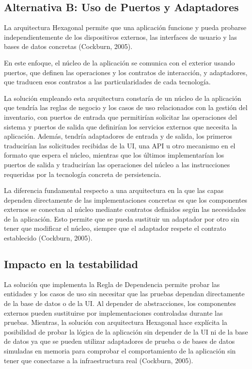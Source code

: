 \documentclass[12pt, a4paper]{article}
\begin{document}
        \subsection*{Alternativa B: Uso de Puertos y Adaptadores}
        La arquitectura Hexagonal permite que una aplicación funcione y pueda probarse independientemente de los dispositivos externos, las interfaces de usuario y las bases de datos concretas (Cockburn, 2005).

        En este enfoque, el núcleo de la aplicación se comunica con el exterior usando puertos, que definen las operaciones y los contratos de interacción, y adaptadores, que traducen esos contratos a las particularidades de cada tecnología.

        La solución empleando esta arquitectura constaría de un núcleo de la aplicación que tendría las reglas de negocio y los casos de uso relacionados con la gestión del inventario, con puertos de entrada que permitirían solicitar las operaciones del sistema y puertos de salida que definirían los servicios externos que necesita la aplicación. Además, tendría adaptadores de entrada y de salida, los primeros traducirían las solicitudes recibidas de la UI, una API u otro mecanismo en el formato que espera el núcleo, mientras que los últimos implementarían los puertos de salida y traducirían las operaciones del núcleo a las instrucciones requeridas por la tecnología concreta de persistencia.

        La diferencia fundamental respecto a una arquitectura en la que las capas dependen directamente de las implementaciones concretas es que los componentes externos se conectan al núcleo mediante contratos definidos según las necesidades de la aplicación. Esto permite que se pueda sustituir un adaptador por otro sin tener que modificar el núcleo, siempre que el adaptador respete el contrato establecido (Cockburn, 2005).

        \subsection{Impacto en la testabilidad}
        La solución que implementa la Regla de Dependencia permite probar las entidades y los casos de uso sin necesitar que las pruebas dependan directamente de la base de datos o de la UI. Al depender de abstracciones, los componentes externos pueden sustituirse por implementaciones controladas durante las pruebas. Mientras, la solución con arquitectura Hexagonal hace explícita la posibilidad de probar la lógica de la aplicación sin depender de la UI ni de la base de datos ya que se pueden utilizar adaptadores de prueba o de bases de datos simuladas en memoria para comprobar el comportamiento de la aplicación sin tener que conectarse a la infraestructura real (Cockburn, 2005).
\end{document}
